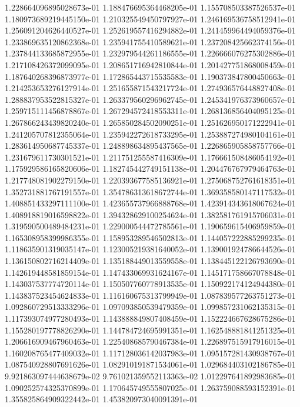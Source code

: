1.228664096895028673e-01
1.188476695364468205e-01
1.155708503387526537e-01
1.180973689219445150e-01
1.210325549450797927e-01
1.246169536758512941e-01
1.256091204626440527e-01
1.252619557416294882e-01
1.241459964494059376e-01
1.233869635120862368e-01
1.235941755410589621e-01
1.237208425662374156e-01
1.237844133685872955e-01
1.232979544261186555e-01
1.226666076275302886e-01
1.217108426372099095e-01
1.208651716942810844e-01
1.201427751868008459e-01
1.187640268396873977e-01
1.172865443715535583e-01
1.190373847800450663e-01
1.214253653276127914e-01
1.251655871543217724e-01
1.274936576448827408e-01
1.288837953522815327e-01
1.263379560296962745e-01
1.245341976373960657e-01
1.259715111456878867e-01
1.267294572418553311e-01
1.268136856404095125e-01
1.267866243439820240e-01
1.265850284502090251e-01
1.251626950171222941e-01
1.241205707812355064e-01
1.235942272618733295e-01
1.253887274980104161e-01
1.283614950687745337e-01
1.248898634895437565e-01
1.226865905858757766e-01
1.231679611730301521e-01
1.211751255587416309e-01
1.176661508486054192e-01
1.175929586165820606e-01
1.182745442749151138e-01
1.204476767979464763e-01
1.217748081902279150e-01
1.220393677585136921e-01
1.275068752761618351e-01
1.352731881767191557e-01
1.354786313618672744e-01
1.369358580147117532e-01
1.408851433297111100e-01
1.423655737966888768e-01
1.423914343618067624e-01
1.408918819016598822e-01
1.394328629100254624e-01
1.382581761915706031e-01
1.319590500489484231e-01
1.229000544472785561e-01
1.190659615406959859e-01
1.165308958399986355e-01
1.158953289546502813e-01
1.144057222885299235e-01
1.118635901319035147e-01
1.123005219381640052e-01
1.139001924786644526e-01
1.136150802716214409e-01
1.135188449013559558e-01
1.138445122126793690e-01
1.142619448581859154e-01
1.147433069931624167e-01
1.145171758667078848e-01
1.143037537774720114e-01
1.150507760778913535e-01
1.150922174124944380e-01
1.143837523454624833e-01
1.116160675313799949e-01
1.087839577263751273e-01
1.092860729513333296e-01
1.097093850539479359e-01
1.099857231062135315e-01
1.117393074977280493e-01
1.143888849807408459e-01
1.152224667628675286e-01
1.155280197778826290e-01
1.144784724695991351e-01
1.162548881841251325e-01
1.206616909467960463e-01
1.225408685790467384e-01
1.226897515917916015e-01
1.160208765477409032e-01
1.117128036142037983e-01
1.095157281430938767e-01
1.087540928807691626e-01
1.082910191871534061e-01
1.029684403102186785e-01
9.921863097444638679e-02
9.761021359552113363e-02
1.012297641892983685e-01
1.090252574325370899e-01
1.170645749555807025e-01
1.263759088593152391e-01
1.355825864909322442e-01
1.453820973040091391e-01

